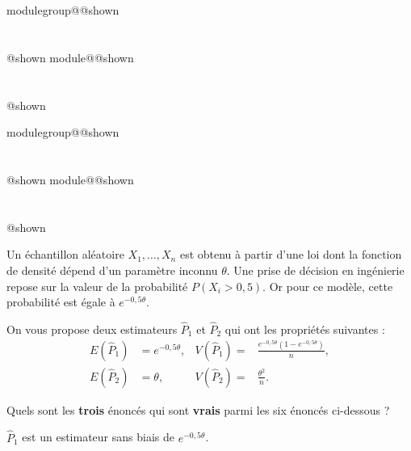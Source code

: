 \documentclass{Evaluation}
\makeatletter
\newcommand{\currentmodulekey}{}
\newcommand{\currentmoduletitle}{}
\newcommand{\currentgroupkey}{}
\newcommand{\currentgrouptitle}{}
\newcommand{\showmoduleifneeded}{%
  \ifx\currentgroupkey\empty\else
    \expandafter\ifx\csname modulegroup@\currentgroupkey @shown\endcsname\relax
      \section*{\currentgrouptitle}%
      \expandafter\gdef\csname modulegroup@\currentgroupkey @shown\endcsname{1}%
    \fi
  \fi
  \expandafter\ifx\csname module@\currentmodulekey @shown\endcsname\relax
    \section*{\currentmoduletitle}%
    \expandafter\gdef\csname module@\currentmodulekey @shown\endcsname{1}%
  \fi
}
\newenvironment{A24}{\showmoduleifneeded}{}
\newenvironment{A25}{\showmoduleifneeded}{}
\makeatother
\begin{document}
\begin{questions}
\begin{A24}
\end{A24}

\begin{A25}
\question {} %

Un échantillon aléatoire $X_1,\dots,X_n$ est obtenu à partir d'une loi dont la fonction
de densité dépend d'un paramètre inconnu $\theta$. Une prise de décision en ingénierie
repose sur la valeur de la probabilité $P(X_i>0,5)$. Or pour ce modèle,
cette probabilité est égale à $e^{-0,5\theta}$.

On vous propose deux estimateurs $\hat{P}_1$ et $\hat{P}_2$ qui ont les propriétés suivantes :
\begin{align*}
    E(\hat{P}_1)&= e^{-0,5\theta},&  V(\hat{P}_1) =& \frac{e^{-0,5\theta}\left(1-e^{-0,5\theta}\right)}{n}, \\
    E(\hat{P}_2) &= \theta,&  V(\hat{P}_2) =&\frac{\theta^2}{n} .
\end{align*}

Quels sont les \textbf{trois} énoncés qui sont \textbf{vrais} parmi les six énoncés ci-dessous ?

\begin{checkboxes}
    \correctchoice $\hat{P}_1$ est un estimateur sans biais de $e^{-0,5\theta}$.


\end{checkboxes}
\end{A25}
\end{questions}
\end{document}
